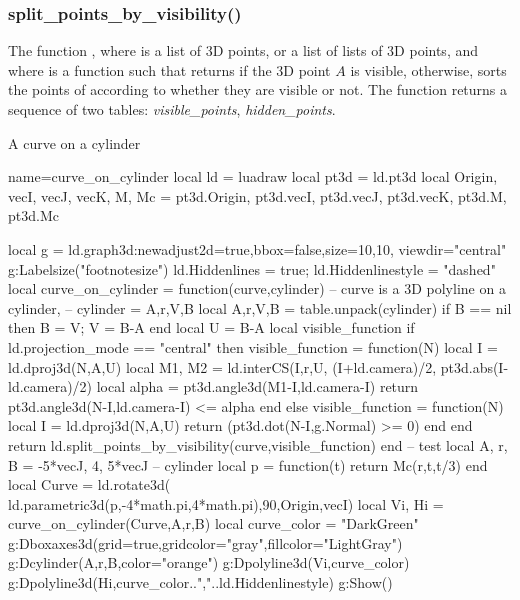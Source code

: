 \subsubsection{split\_points\_by\_visibility()}

The function , where  is a list of 3D points, or a list of lists of 3D points, and where  is a function such that  returns \true if the 3D point $A$ is visible, \false otherwise, sorts the points of  according to whether they are visible or not. The function returns a sequence of two tables: \emph{visible\_points}, \emph{hidden\_points}.

\begin{demo}{A curve on a cylinder}
\begin{luadraw}{name=curve_on_cylinder}
local ld = luadraw
local pt3d = ld.pt3d
local Origin, vecI, vecJ, vecK, M, Mc = pt3d.Origin, pt3d.vecI, pt3d.vecJ, pt3d.vecK, pt3d.M, pt3d.Mc

local g = ld.graph3d:new{adjust2d=true,bbox=false,size={10,10}, viewdir="central"}
g:Labelsize("footnotesize")
ld.Hiddenlines = true; ld.Hiddenlinestyle = "dashed"
local curve_on_cylinder = function(curve,cylinder)
-- curve is a 3D polyline on a cylinder,
-- cylinder = {A,r,V,B}
    local A,r,V,B = table.unpack(cylinder)
    if B == nil then B = V; V = B-A end
    local U = B-A
    local visible_function
    if ld.projection_mode == "central" then
        visible_function = function(N)
            local I = ld.dproj3d(N,{A,U})
            local M1, M2 = ld.interCS({I,r,U},{ (I+ld.camera)/2, pt3d.abs(I-ld.camera)/2})
            local alpha = pt3d.angle3d(M1-I,ld.camera-I)
            return pt3d.angle3d(N-I,ld.camera-I) <= alpha
        end
    else
        visible_function = function(N)
            local I = ld.dproj3d(N,{A,U})
            return (pt3d.dot(N-I,g.Normal) >= 0)
        end
    end
    return ld.split_points_by_visibility(curve,visible_function)
end
-- test
local A, r, B = -5*vecJ, 4, 5*vecJ -- cylinder
local p = function(t) return Mc(r,t,t/3) end
local Curve = ld.rotate3d( ld.parametric3d(p,-4*math.pi,4*math.pi),90,{Origin,vecI})
local Vi, Hi = curve_on_cylinder(Curve,{A,r,B})
local curve_color = "DarkGreen"
g:Dboxaxes3d({grid=true,gridcolor="gray",fillcolor="LightGray"})
g:Dcylinder(A,r,B,{color="orange"})
g:Dpolyline3d(Vi,curve_color)
g:Dpolyline3d(Hi,curve_color..","..ld.Hiddenlinestyle)
g:Show()
\end{luadraw}
\end{demo}
